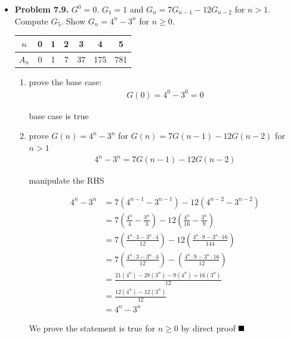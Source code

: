 \documentclass{article}
\begin{document}
    \begin{itemize}
        \item \textbf{Problem 7.9.} $G^0 = 0$. $G_1 = 1$ and $G_n = 7G_{n-1} - 12 G_{n-2}$ for $n > 1$. Compute $G_5$. Show $G_n = 4^n - 3^n$ for $n \geq 0$.\\
        \begin{tabular}{ |c|c|c|c|c|c|c| } 
            \hline
            $n$ & 0 & 1 & 2 & 3 & 4 & 5\\ 
            \hline
            $A_n$ & 0 & 1 & 7 & 37 & 175 & 781 \\
            \hline
        \end{tabular}
        \begin{enumerate}[label=(\roman*)]
            \item prove the base case:
            \begin{align*}
                G(0) = 4^0 - 3^0 = 0
            \end{align*}
            \begin{center}
                base case is true
            \end{center}
            \item prove $G(n) = 4^n - 3^n$ for $G(n) = 7G(n-1) - 12G(n-2)$ for $n>1$
            \begin{align*}
                4^n - 3^n = 7G(n-1) - 12G(n-2)
            \end{align*}
            \begin{center}
                manipulate the RHS
            \end{center}
            \begin{align*}
                4^n - 3^n &= 7(4^{n-1} - 3^{n-1}) - 12(4^{n-2} - 3^{n-2})\\
                          &= 7 (\frac{4^n}{4} - \frac{3^n}{3}) - 12(\frac{4^n}{16} - \frac{3^n}{9})\\
                          &= 7(\frac{4^n \cdot 3 - 3^n \cdot 4}{12}) - 12(\frac{4^n \cdot 9 - 3^n \cdot 16}{144})\\
                          &= 7(\frac{4^n \cdot 3 - 3^n \cdot 4}{12}) - (\frac{4^n \cdot 9 - 3^n \cdot 16}{12})\\
                          &= \frac{21(4^n) - 28(3^n) - 9(4^n) + 16(3^n)}{12}\\
                          &= \frac{12(4^n) - 12(3^n)}{12}\\
                          &= 4^n - 3^n
            \end{align*}
            \begin{center}
                We prove the statement is true for $n \geq 0$ by direct proof $\hfill\blacksquare$
            \end{center}


\end{enumerate}
\end{itemize}
\end{document}

